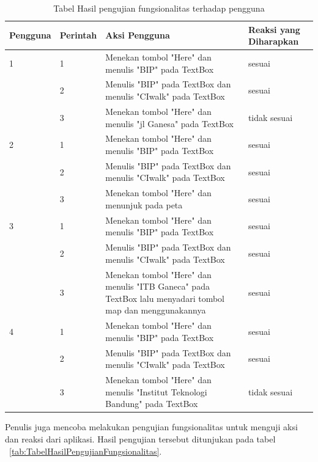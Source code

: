 \begin{table}[h]
	\centering
		\begin{tabular}{|p{1,5cm}|p{}|p{5cm}|p{4cm}|}\hline
				Pengguna & Perintah & Aksi Pengguna & Reaksi yang Diharapkan \\ \hline
				1 & 1 & Menekan tombol "Here" dan menulis "BIP" pada TextBox & sesuai \\ \hline
				  & 2 & Menulis "BIP" pada TextBox dan menulis "CIwalk" pada TextBox & sesuai \\ \hline
				  & 3 & Menekan tombol "Here" dan menulis "jl Ganesa" pada TextBox & tidak sesuai \\ \hline
				2 & 1 & Menekan tombol "Here" dan menulis "BIP" pada TextBox & sesuai \\ \hline
				  & 2 & Menulis "BIP" pada TextBox dan menulis "CIwalk" pada TextBox & sesuai \\ \hline
				  & 3 & Menekan tombol "Here" dan menunjuk pada peta & sesuai \\ \hline
				3 & 1 & Menekan tombol "Here" dan menulis "BIP" pada TextBox & sesuai \\ \hline
				  & 2 & Menulis "BIP" pada TextBox dan menulis "CIwalk" pada TextBox & sesuai \\ \hline
				  & 3 & Menekan tombol "Here" dan menulis "ITB Ganeca" pada TextBox lalu menyadari tombol map dan menggunakannya & sesuai \\ \hline
				4 & 1 & Menekan tombol "Here" dan menulis "BIP" pada TextBox & sesuai \\ \hline
				  & 2 & Menulis "BIP" pada TextBox dan menulis "CIwalk" pada TextBox & sesuai \\ \hline
				  & 3 & Menekan tombol "Here" dan menulis "Institut Teknologi Bandung" pada TextBox & tidak sesuai \\ \hline			
		\end{tabular}
	\caption{Tabel Hasil pengujian fungsionalitas terhadap pengguna}
	\label{tab:TabelHasilPengujianFungsionalitasTerhadapPengguna}
\end{table}

Penulis juga mencoba melakukan pengujian fungsionalitas untuk menguji aksi dan reaksi dari aplikasi. Hasil pengujian tersebut ditunjukan pada tabel ~\ref{tab:TabelHasilPengujianFungsionalitas}.


